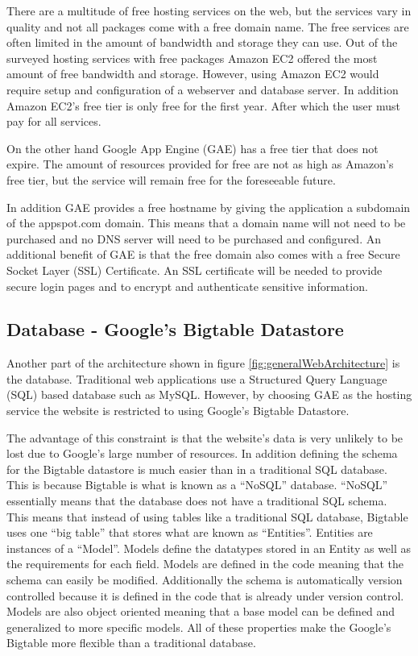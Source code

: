\documentclass{article}
\begin{document}
There are a multitude of free hosting services on the web, but the services vary in quality and not all packages
come with a free domain name. The free services are often limited in the amount of bandwidth and storage they can use.
Out of the surveyed hosting services with free packages Amazon EC2 offered the most amount of free bandwidth and storage. \cite{amazon_amazon_2012} \cite{heroku_heroku_2012} \cite{google_quotas_2012} However, using Amazon EC2 would require setup and configuration of a webserver and database server. In addition Amazon EC2's free tier is only free for the first year. After which the user must pay for all services.

On the other hand Google App Engine (GAE) has a free tier that does not expire. The amount of resources provided for free are not as high as Amazon's free tier, but the service will remain free for the foreseeable future.  \cite{google_quotas_2012} 

In addition GAE provides a free hostname by giving the application a subdomain of the appspot.com domain. This means
that a domain name will not need to be purchased and no DNS server will need to be purchased and configured.
An additional benefit of GAE is that the free domain also comes with a free Secure Socket Layer (SSL) Certificate. An SSL 
certificate will be needed to provide secure login pages and to encrypt and authenticate sensitive information.

\subsection{Database - Google's Bigtable Datastore}

Another part of the architecture shown in figure \ref{fig:generalWebArchitecture} is the database. Traditional web
applications use a Structured Query Language (SQL) based database such as MySQL. However, by choosing GAE as the hosting service the website
is restricted to using Google's Bigtable Datastore.

The advantage of this constraint is that the website's data is very unlikely to be lost due to Google's large number
of resources. In addition defining the schema for the Bigtable datastore is much easier than in a traditional SQL database.
This is because Bigtable is what is known as a ``NoSQL'' database. \cite{google_how_2012} ``NoSQL'' essentially means that the database does not have a traditional SQL schema. This means that instead of using tables like a traditional
SQL database, Bigtable uses one ``big table'' that stores what are known as ``Entities''. Entities are instances of a ``Model''. Models define the datatypes stored in an Entity as well as the requirements for each field. Models are defined in the code meaning that
the schema can easily be modified. Additionally the schema is automatically version controlled because it is defined in the
code that is already under version control. Models are also object oriented meaning that a base model can be defined and
generalized to more specific models. All of these properties make the Google's Bigtable more flexible than a traditional
database.
\end{document}
